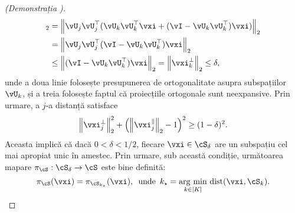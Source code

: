 \documentclass[../../book-main_ro.tex]{subfiles}
\begin{document}
\begin{proof}[(Demonstrația )]
\begin{align}
{        }_2
        &=
        \norm*{
            \vU_j \vU_j^\top( \vU_k \vU_k^\top \vxi + (\vI - \vU_k \vU_k^\top)
            \vxi )
        }_2
        \\
        &=
        \norm*{
            \vU_j \vU_j^\top (\vI - \vU_k \vU_k^\top) \vxi
        }_2
        \\
        &\leq
        \norm*{
            (\vI - \vU_k \vU_k^\top) \vxi
        }_2
        =
        \norm*{
            \vxi_k^{\perp}
        }_2
        \leq \delta,
    \end{align}
    unde a doua linie folosește presupunerea de ortogonalitate asupra subspațiilor
    $\vU_k$, și a treia folosește faptul că proiecțiile ortogonale sunt
    neexpansive.
    Prin urmare, a $j$-a distanță satisface
    \begin{equation}
        \norm*{\vxi^{\perp}_j}_2^2
        + \left( \norm*{\vxi^{\|}_j}_2 - 1 \right)^2
        \geq
        (1 - \delta)^2.
    \end{equation}
    Aceasta implică că dacă $0 < \delta < 1/2$, fiecare $\vxi \in \cS_{\delta}$ are
    un subspațiu cel mai apropiat unic în amestec.
    Prin urmare, sub această condiție, următoarea mapare $\pi_{\cS} : \cS_{\delta}
    \to \cS$ este bine definită:
    \begin{equation}
        \pi_{\cS}(\vxi) 
        =
        \pi_{\cS_{k_\star}}(\vxi),
        \enspace\text{unde}\enspace
        k_{\star} = \argmin_{k \in [K]}\,
        \dist(\vxi, \cS_{k}).
    \end{equation}



\end{proof}
\end{document}
